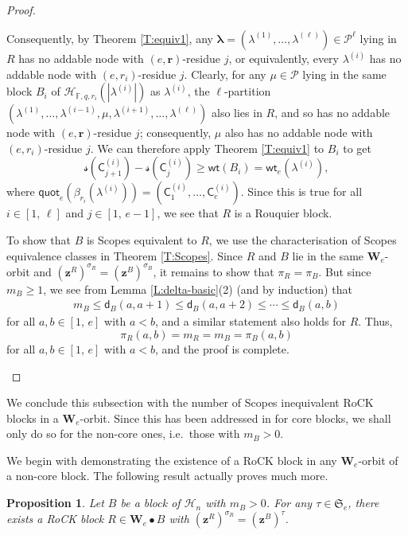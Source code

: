 \documentclass[11pt,a4paper,reqno]{amsart}
\numberwithin{equation}{section}
\theoremstyle{plain}
\newtheorem{prop}[thm]{Proposition}
\theoremstyle{definition}
\theoremstyle{remark}
\numberwithin{equation}{section}
\newcommand{\bl}{\boldsymbol{\lambda}}
\newcommand{\fs}{\mathcal{s}}
\newcommand{\br}{\mathbf{r}}
\newcommand{\bz}{\mathbf{z}}
\newcommand{\wt}{\mathsf{wt}}
\newcommand{\quot}{\mathsf{quot}}
\newcommand{\HH}{\mathcal{H}}
\newcommand{\C}{\mathsf{C}}
\newcommand{\FF}{\mathbb{F}}
\newcommand{\PP}{\mathcal{P}}
\newcommand{\AW}{\mathbf{W}}
\newcommand{\sym}[1]{\mathfrak{S}_{#1}}
\newcommand{\DDot}[1]{\mathrel{\overset{#1}{\bullet}}}
\newcommand{\dd}{\mathsf{d}}
\begin{document}
\begin{proof}
\begin{description}
Consequently, by Theorem \ref{T:equiv1}, 
any $\bl = (\lambda^{(1)},\dotsc, \lambda^{(\ell)}) \in \PP^{\ell}$ lying in $R$ has no addable node with $(e,\br)$-residue $j$, or equivalently, every $\lambda^{(i)}$ has no addable node with $(e,r_i)$-residue $j$.
Clearly, for any $\mu \in \PP$ lying in the same block $B_i$ of $\HH_{\FF, q, r_i}(|\lambda^{(i)}|)$ as $\lambda^{(i)}$, the $\ell$-partition $(\lambda^{(1)}, \dotsc, \lambda^{(i-1)}, \mu , \lambda^{(i+1)}, \dotsc, \lambda^{(\ell)})$ also lies in $R$, and so has no addable node with $(e,\br)$-residue $j$; consequently, $\mu$ also has no addable node with $(e,r_i)$-residue $j$.
We can therefore apply Theorem \ref{T:equiv1} to $B_i$ to get 
$$\fs(\C^{(i)}_{j+1}) - \fs(\C^{(i)}_j) \geq \wt(B_i) = \wt_e(\lambda^{(i)}),$$ where $\quot_e(\beta_{r_i}(\lambda^{(i)})) = (\C^{(i)}_1,\dotsc, \C^{(i)}_e)$.
Since this is true for all $i \in [1,\,\ell]$ and $j \in [1,\,e-1]$, we see that $R$ is a Rouquier block.  

To show that $B$ is Scopes equivalent to $R$, we use the characterisation of Scopes equivalence classes in  Theorem \ref{T:Scopes}.  Since $R$ and $B$ lie in the same $\AW_e$-orbit and $(\bz^R)^{\sigma_R} = (\bz^B)^{\sigma_B}$, it remains to show that $\pi_R = \pi_B$.
But since $m_B \geq 1$, we see from Lemma \ref{L:delta-basic}(2) (and by induction) that
\begin{align*}
m_B \leq \dd_B(a,a+1) \leq \dd_B(a,a+2) \leq \dotsb \leq \dd_B(a,b)
\end{align*}
for all $a, b \in [1,\,e]$ with $a < b$, and a similar statement also holds for $R$.
Thus, $$\pi_R(a,b) = m_R = m_B = \pi_B(a,b)$$ for all $a, b \in [1,\,e]$ with $a < b$, and the proof is complete.
\end{description}
\end{proof}

We conclude this subsection with the number of Scopes inequivalent RoCK blocks in a $\AW_e$-orbit.  
Since this has been addressed in \cite[Proposition 4.25]{LQT} for core blocks, we shall only do so for the non-core ones, i.e.\ those with $m_B > 0$.

We begin with demonstrating the existence of a RoCK block in any $\AW_e$-orbit of a non-core block.  The following result actually proves much more.

\begin{prop} \label{P:RoCK-exist}
Let $B$ be a block of $\HH_n$ with $m_B > 0$.
For any $\tau \in \sym{e}$, there exists a RoCK block $R \in \AW_e \DDot{} B$ with $(\bz^R)^{\sigma_R} = (\bz^B)^{\tau}$.
\end{prop}
\end{document}

